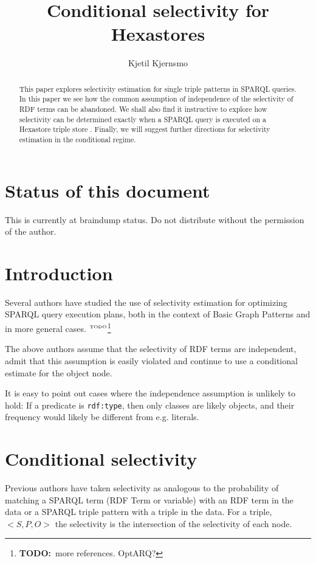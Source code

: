 \documentclass[12pt, draft]{article}
\title{Conditional selectivity for Hexastores}
\author{Kjetil Kjernsmo}
\newcommand{\rdfterm}[1]{\texttt{#1}}
\newcommand{\todo}[1]{\ensuremath{^{\textrm{\tiny{TODO}\normalsize}}}\footnote{\textbf{TODO:}~#1}}
\begin{document}
\maketitle

\section*{Status of this document}

This is currently at braindump status. Do not distribute without the
permission of the author.

\begin{abstract}
  This paper explores selectivity estimation for single triple
  patterns in SPARQL queries. In this paper we see how the common
  assumption of independence of the selectivity of RDF terms can be
  abandoned. We shall also find it instructive to explore how
  selectivity can be determined exactly when a SPARQL query is
  executed on a Hexastore triple store
  \cite{Weiss:2008:HSI:1453856.1453965}. Finally, we will suggest
  further directions for selectivity estimation in the conditional
  regime.

\end{abstract}

\section{Introduction}

Several authors have studied the use of selectivity estimation for
optimizing SPARQL query execution plans, both in the context of Basic
Graph Patterns \cite{Stocker:2008:SBG:1367497.1367578} and in more
general cases. \todo{more references. OptARQ?}

The above authors assume that the selectivity of RDF terms are
independent, admit that this assumption is easily violated and
continue to use a conditional estimate for the object node.

It is easy to point out cases where the independence assumption is
unlikely to hold: If a predicate is \rdfterm{rdf:type}, then only
classes are likely objects, and their frequency  would likely be
different from e.g. literals.

\section{Conditional selectivity}

Previous authors have taken selectivity as analogous to the
probability of matching a SPARQL term (RDF Term or variable) with an
RDF term in the data or a SPARQL triple pattern with a triple in the
data.  For a triple, $<S, P, O>$ the selectivity is the intersection
of the selectivity of each node.
\end{document}
